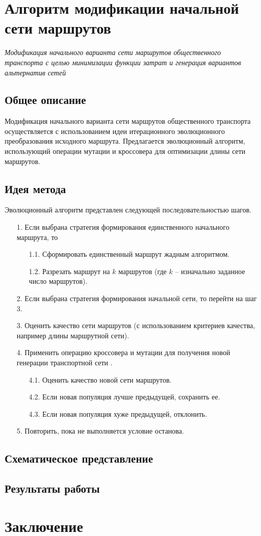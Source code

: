 \clearpage

\section{Алгоритм модификации начальной сети маршрутов}
\label{sec:third-alg}
\emph{Модификация начального варианта сети маршрутов общественного транспорта с целью минимизации функции 
затрат и генерация вариантов альтернатив сетей}
\subsection{Общее описание}
Модификация начального варианта сети маршрутов общественного транспорта осуществляется с использованием идеи 
итерационного эволюционного преобразования исходного маршрута. Предлагается эволюционный алгоритм, 
использующий операции мутации и кроссовера для оптимизации длины сети маршрутов.

\subsection{Идея метода}
Эволюционный алгоритм представлен следующей последовательностью шагов. 
\begin{enumerate}
    \item[1.] Если выбрана стратегия формирования единственного начального маршрута, то 
    \begin{enumerate}
        \item[1.1.] Сформировать единственный маршрут жадным алгоритмом.
        \item[1.2.] Разрезать маршрут на \( k \) маршрутов (где \( k \) -- изначально заданное число 
            маршрутов).
    \end{enumerate}
    \item[2.] Если выбрана стратегия формирования начальной сети, то перейти на шаг 3.
    \item[3.] Оценить качество сети маршрутов (с использованием критериев качества, например длины 
        маршрутной сети).
    \item[4.] Применить операцию кроссовера и мутации для получения новой генерации транспортной 
        сети \cite{bib:20}.
    \begin{enumerate}
        \item[4.1.] Оценить качество новой сети маршрутов.
        \item[4.2.] Если новая популяция лучше предыдущей, сохранить ее.
        \item[4.3.] Если новая популяция хуже предыдущей, отклонить. 
    \end{enumerate}
    \item[5.] Повторить, пока не выполняется условие останова.
\end{enumerate}

\subsection{Схематическое представление}
\subsection{Результаты работы}

\section{Заключение}